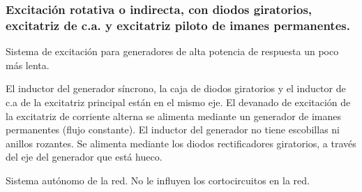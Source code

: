 		\subsubsection{Excitación rotativa o indirecta, con diodos giratorios, excitatriz de c.a. y excitatriz piloto de imanes permanentes.}
			Sistema de excitación para generadores de alta potencia de respuesta un poco más lenta. 
			
			
			El inductor del generador síncrono, la caja de diodos giratorios y el inductor de c.a de la excitatriz principal están en el mismo eje. El devanado de excitación de la excitatriz de corriente alterna se alimenta mediante un generador de imanes permanentes (flujo constante). El inductor del generador no tiene escobillas ni anillos rozantes. Se alimenta mediante los diodos rectificadores giratorios, a través del eje del generador que está hueco.
			
			
			Sistema autónomo de la red. No le influyen los cortocircuitos en la red.
			
